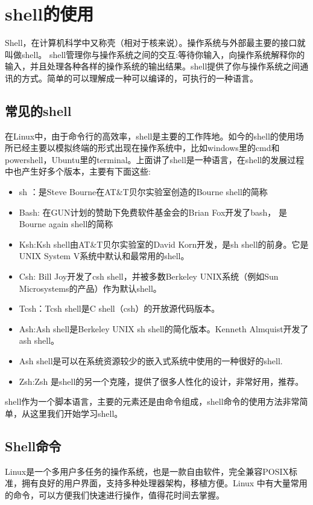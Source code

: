 \section{shell的使用}
Shell，在计算机科学中又称壳（相对于核来说）。操作系统与外部最主要的接口就叫做shell。
shell管理你与操作系统之间的交互:等待你输入，向操作系统解释你的输入，并且处理各种各样的操作系统的输出结果。shell提供了你与操作系统之间通讯的方式。简单的可以理解成一种可以编译的，可执行的一种语言。
\subsection{常见的shell}
在Linux中，由于命令行的高效率，shell是主要的工作阵地。如今的shell的使用场所已经主要以模拟终端的形式出现在操作系统中，比如windows里的cmd和powershell，Ubuntu里的terminal。上面讲了shell是一种语言，在shell的发展过程中也产生好多个版本，主要有下面这些:
\begin{itemize}
	\item sh ：是Steve Bourne在AT\&T贝尔实验室创造的Bourne shell的简称
	\item Bash: 在GUN计划的赞助下免费软件基金会的Brian Fox开发了bash， 是Bourne again shell的简称
	\item Ksh:Ksh shell由AT\&T贝尔实验室的David Korn开发，是sh shell的前身。它是UNIX System V系统中默认和最常用的shell。
	\item Csh: Bill Joy开发了csh shell，并被多数Berkeley UNIX系统（例如Sun Microsystems的产品）作为默认shell。
	\item Tcsh：Tcsh shell是C shell（csh）的开放源代码版本。
	\item Ash:Ash shell是Berkeley UNIX sh shell的简化版本。Kenneth Almquist开发了ash shell。 
	\item Ash shell是可以在系统资源较少的嵌入式系统中使用的一种很好的shell.
	\item Zsh:Zsh 是shell的另一个克隆，提供了很多人性化的设计，非常好用，推荐。
\end{itemize}


shell作为一个脚本语言，主要的元素还是由命令组成，shell命令的使用方法非常简单，从这里我们开始学习shell。

\subsection{Shell命令}

Linux是一个多用户多任务的操作系统，也是一款自由软件，完全兼容POSIX标准，拥有良好的用户界面，支持多种处理器架构，移植方便。Linux 中有大量常用的命令，可以方便我们快速进行操作，值得花时间去掌握。

